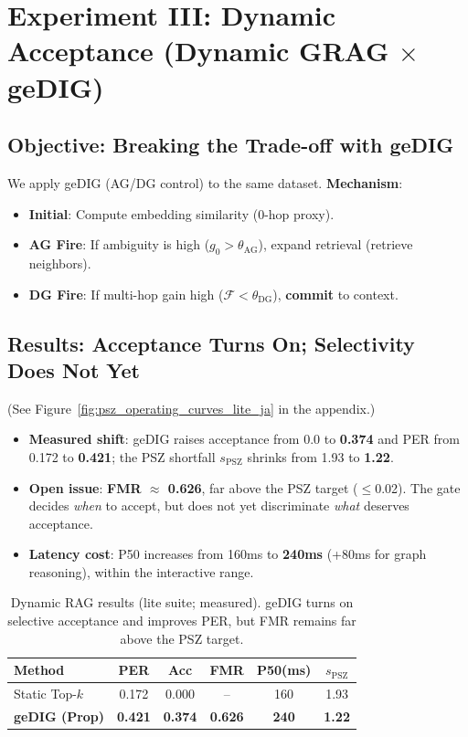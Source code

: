 \documentclass[12pt]{article}
\newcommand{\F}{\mathcal{F}}
\begin{document}
\section{Experiment III: Dynamic Acceptance (Dynamic GRAG \texorpdfstring{$\times$}{x} geDIG)}
\label{sec:dynamic_rag_experiment}

\subsection{Objective: Breaking the Trade-off with geDIG}
We apply geDIG (AG/DG control) to the same dataset.
\textbf{Mechanism}:
\begin{itemize}
    \item \textbf{Initial}: Compute embedding similarity (0-hop proxy).
    \item \textbf{AG Fire}: If ambiguity is high ($g_0 > \theta_{\mathrm{AG}}$), expand retrieval (retrieve neighbors).
    \item \textbf{DG Fire}: If multi-hop gain high ($\F < \theta_{\mathrm{DG}}$), \textbf{commit} to context.
\end{itemize}

\subsection{Results: Acceptance Turns On; Selectivity Does Not Yet}
(See Figure~\ref{fig:psz_operating_curves_lite_ja} in the appendix.)
\begin{itemize}
    \item \textbf{Measured shift}: geDIG raises acceptance from 0.0 to \textbf{0.374} and PER from 0.172 to \textbf{0.421}; the PSZ shortfall $s_{\mathrm{PSZ}}$ shrinks from 1.93 to \textbf{1.22}.
    \item \textbf{Open issue}: \textbf{FMR $\approx$ 0.626}, far above the PSZ target ($\le$0.02). The gate decides \emph{when} to accept, but does not yet discriminate \emph{what} deserves acceptance.
    \item \textbf{Latency cost}: P50 increases from 160ms to \textbf{240ms} (+80ms for graph reasoning), within the interactive range.
\end{itemize}

\begin{table}[H]
    \centering
    \caption{Dynamic RAG results (lite suite; measured). geDIG turns on selective acceptance and improves PER, but FMR remains far above the PSZ target.}
    \label{tab:rag_dynamic_result}
    \small
    \begin{tabular}{lccccc}
    \toprule
    Method & PER & Acc & FMR & P50(ms) & $s_{\mathrm{PSZ}}$ \\
    \midrule
    Static Top-$k$ & 0.172 & 0.000 & -- & 160 & 1.93 \\
    \textbf{geDIG (Prop)} & \textbf{0.421} & \textbf{0.374} & \textbf{0.626} & \textbf{240} & \textbf{1.22} \\
    \bottomrule
    \end{tabular}
\end{table}
\end{document}
